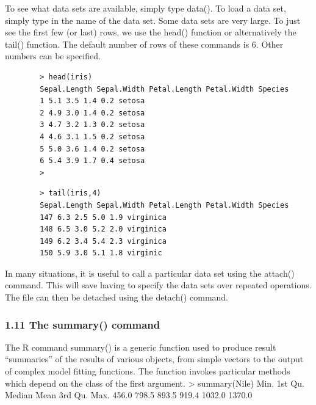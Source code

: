 \documentclass{beamer}
\begin{document}
	\begin{frame}
		
		
		To see what data sets are available, simply type data(). To load a data set, simply type in the
		name of the data set. Some data sets are very large. To just see the first few (or last) rows, we
		use the head() function or alternatively the tail() function. The default number of rows of
		these commands is 6. Other numbers can be specified.
		
	\end{frame}
	\begin{frame}[fragile]
		\begin{verbatim}
		> head(iris)
		Sepal.Length Sepal.Width Petal.Length Petal.Width Species
		1 5.1 3.5 1.4 0.2 setosa
		2 4.9 3.0 1.4 0.2 setosa
		3 4.7 3.2 1.3 0.2 setosa
		4 4.6 3.1 1.5 0.2 setosa
		5 5.0 3.6 1.4 0.2 setosa
		6 5.4 3.9 1.7 0.4 setosa
		>
		\end{verbatim}
		
	\end{frame}
	\begin{frame}[fragile]
		\begin{verbatim}
		> tail(iris,4)
		Sepal.Length Sepal.Width Petal.Length Petal.Width Species
		147 6.3 2.5 5.0 1.9 virginica
		148 6.5 3.0 5.2 2.0 virginica
		149 6.2 3.4 5.4 2.3 virginica
		150 5.9 3.0 5.1 1.8 virginic
		\end{verbatim}
		
	\end{frame}
	\begin{frame}
		In many situations, it is useful to call a particular data set using the attach() command. This
		will save having to specify the data sets over repeated operations. The file can then be detached
		using the detach() command.
		
		
	\end{frame}
	\begin{frame}[fragile]
		\frametitle{1.11 The summary() command}
		The R command summary() is a generic function used to produce result “summaries” of the
		results of various objects, from simple vectors to the output of complex model fitting functions.
		The function invokes particular methods which depend on the class of the first argument.
		> summary(Nile)
		Min. 1st Qu. Median Mean 3rd Qu. Max.
		456.0 798.5 893.5 919.4 1032.0 1370.0
	\end{frame}
\end{document}
